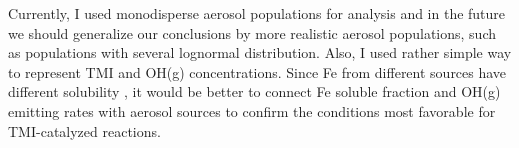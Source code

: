 \documentclass[edeposit,fullpage]{uiucthesis2009}
\begin{document}
Currently, I used monodisperse aerosol populations for analysis and in
the future we should generalize our conclusions by more realistic
aerosol populations, such as populations with several lognormal
distribution. Also, I used rather simple way to represent TMI and
OH(g) concentrations. Since Fe from different sources have different
solubility \citep{desboeufs2005dissolution}, it would be better to
connect Fe soluble fraction and OH(g) emitting rates with aerosol
sources to confirm the conditions most favorable for TMI-catalyzed
reactions.

\backmatter
\renewcommand{\bibname}{References}


\end{document}
